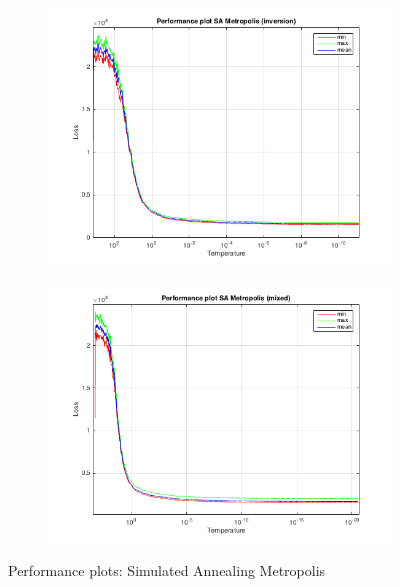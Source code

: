 \documentclass{paper}
\begin{document}
\begin{figure}[!h]
{\begin{subfigure}[]{0.7\linewidth}
        		\includegraphics[width=\linewidth]{SAMetropolis(inversion)_performance}
    	\end{subfigure}%
    	\begin{subfigure}[]{0.7\linewidth}
		\centering
        		\includegraphics[width=\linewidth]{SAMetropolis(mixed)_performance}
    	\end{subfigure}
    }
    \caption{Performance plots: Simulated Annealing Metropolis}    
\label{fig:MetroPerf}
\end{figure}
\end{document}
